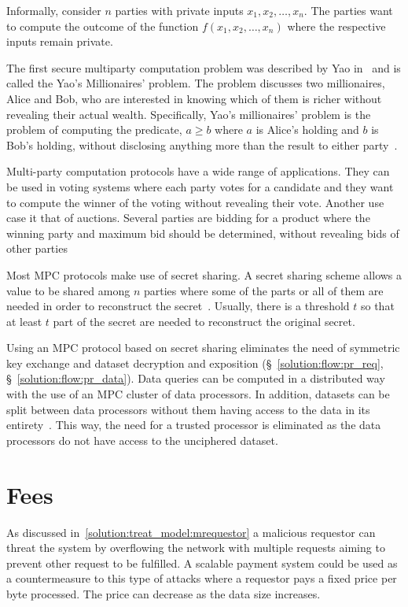 Informally, consider $n$ parties with private inputs $x_1, x_2, \dots, x_n$. The parties want to compute the outcome of the function $f(x_1, x_2, \dots, x_n)$ where the respective inputs remain private.

The first secure multiparty computation problem was described by Yao in~\cite{Yao:1982:PSC:1398511.1382751} and is called the Yao's Millionaires' problem. The problem discusses two millionaires, Alice and Bob, who are interested in knowing which of them is richer without revealing their actual wealth. Specifically, Yao’s millionaires’ problem is the problem of computing the predicate, $a \geq b$ where $a$ is Alice's holding and $b$ is Bob's holding, without disclosing anything more than the result to either party~\cite{mpc_ioannidis}.

Multi-party computation protocols have a wide range of applications. They can be used in voting systems where each party votes for a candidate and they want to compute the winner of the voting without revealing their vote. Another use case it that of auctions. Several parties are bidding for a product where the winning party and maximum bid should be determined, without revealing bids of other parties

Most MPC protocols make use of secret sharing. A secret sharing scheme allows a value to be shared among $n$ parties where some of the parts or all of them are needed in order to reconstruct the secret~\cite{Kamm:2015:ASM:2836836}. Usually, there is a threshold $t$ so that at least $t$ part of the secret are needed to reconstruct the original secret.

Using an MPC protocol based on secret sharing eliminates the need of symmetric key exchange and dataset decryption and exposition (§~\ref{solution:flow:pr_req}, §~\ref{solution:flow:pr_data}). Data queries can be computed in a distributed way with the use of an MPC cluster of data processors. In addition, datasets can be split between data processors without them having access to the data in its entirety~\cite{DBLP:journals/corr/ZyskindNP15}. This way, the need for a trusted processor is eliminated as the data processors do not have access to the unciphered dataset.

\section{Fees}
\label{future_work:fees}

As discussed in~\ref{solution:treat_model:mrequestor} a malicious requestor can threat the system by overflowing the network with multiple requests aiming to prevent other request to be fulfilled. A scalable payment system could be used as a countermeasure to this type of attacks where a requestor pays a fixed price per byte processed. The price can decrease as the data size increases.

